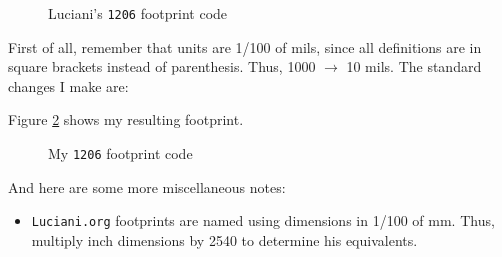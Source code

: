 \begin{figure}[ht]
	\begin{center}
		\begin{minipage}{10cm}
			
		\end{minipage}
		\caption{Luciani's \texttt{1206} footprint code\label{luciani_1206}}
	\end{center} 
\end{figure}

First of all, remember that units are 1/100 of mils, since all definitions are in square brackets instead of parenthesis.  Thus, 1000 $\rightarrow$ 10 mils.  The standard changes I make are:

Figure \ref{jps_1206} shows my resulting footprint.
\begin{figure}[ht]
	\begin{center}
		\begin{minipage}{10cm}
			
		\end{minipage}
		\caption{My \texttt{1206} footprint code\label{jps_1206}}
	\end{center} 
\end{figure}

And here are some more miscellaneous notes:
\begin{itemize}
	\item \texttt{Luciani.org} footprints are named using dimensions in 1/100 of mm.  Thus, multiply inch dimensions by 2540 to determine his equivalents.
\end{itemize}

